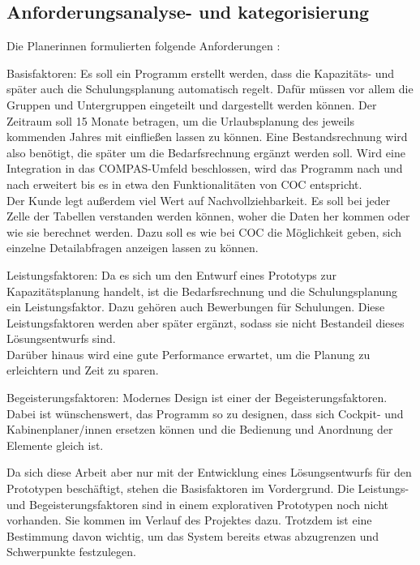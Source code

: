 \documentclass [12pt, a4paper, oneside, titlepage, ngerman]{article}
\begin{document}
\subsection{Anforderungsanalyse- und kategorisierung}
Die Planerinnen formulierten folgende Anforderungen \cite[vgl.][]{Gespraech2}:
\begin{description}
\item Basisfaktoren: Es soll ein Programm erstellt werden, dass die Kapazitäts- und später auch die Schulungsplanung automatisch regelt. Dafür müssen vor allem die Gruppen und Untergruppen eingeteilt und dargestellt werden können. Der Zeitraum soll 15 Monate betragen, um die Urlaubsplanung des jeweils kommenden Jahres mit einfließen lassen zu können. Eine Bestandsrechnung wird also benötigt, die später um die Bedarfsrechnung ergänzt werden soll. Wird eine Integration in das COMPAS-Umfeld beschlossen, wird das Programm nach und nach erweitert bis es in etwa den Funktionalitäten von \ac{COC} entspricht. \\
Der Kunde legt außerdem viel Wert auf Nachvollziehbarkeit. Es soll bei jeder Zelle der Tabellen verstanden werden können, woher die Daten her kommen oder wie sie berechnet werden. Dazu soll es wie bei \ac{COC} die Möglichkeit geben, sich einzelne Detailabfragen anzeigen lassen zu können.
\item Leistungsfaktoren: Da es sich um den Entwurf eines Prototyps zur Kapazitätsplanung handelt, ist die Bedarfsrechnung und die Schulungsplanung ein Leistungsfaktor. Dazu gehören auch Bewerbungen für Schulungen. Diese Leistungsfaktoren werden aber später ergänzt, sodass sie nicht Bestandeil dieses Lösungsentwurfs sind. \\
Darüber hinaus wird eine gute Performance erwartet, um die Planung zu erleichtern und Zeit zu sparen.
\item Begeisterungsfaktoren: Modernes Design ist einer der Begeisterungsfaktoren. Dabei ist wünschenswert, das Programm so zu designen, dass sich Cockpit- und Kabinenplaner/innen ersetzen können und die Bedienung und Anordnung der Elemente gleich ist. 
\end{description}
Da sich diese Arbeit aber nur mit der Entwicklung eines Lösungsentwurfs für den Prototypen beschäftigt, stehen die Basisfaktoren im Vordergrund. Die Leistungs- und Begeisterungsfaktoren sind in einem explorativen Prototypen noch nicht vorhanden. Sie kommen im Verlauf des Projektes dazu. Trotzdem ist eine Bestimmung davon wichtig, um das System bereits etwas abzugrenzen und Schwerpunkte festzulegen.
\end{document}

